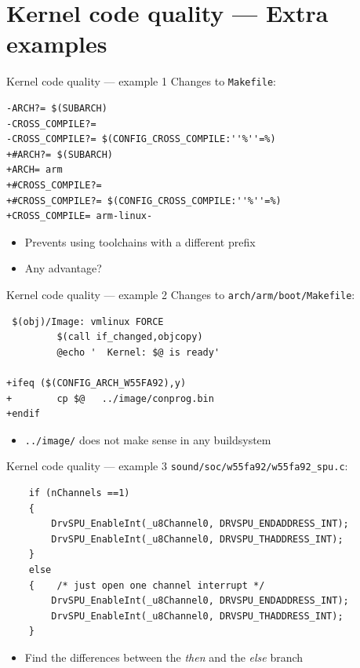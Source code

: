 \documentclass[xetex,table,aspectratio=169]{beamer}
\begin{document}
\section{Kernel code quality --- Extra examples}

\begin{frame}[fragile]{Kernel code quality --- example 1}
  Changes to \texttt{Makefile}:

  \begin{verbatim}
-ARCH?= $(SUBARCH)
-CROSS_COMPILE?=
-CROSS_COMPILE?= $(CONFIG_CROSS_COMPILE:''%''=%)
+#ARCH?= $(SUBARCH)
+ARCH= arm
+#CROSS_COMPILE?=
+#CROSS_COMPILE?= $(CONFIG_CROSS_COMPILE:''%''=%)
+CROSS_COMPILE= arm-linux-
  \end{verbatim}

  \begin{itemize}
  \item Prevents using toolchains with a different prefix
  \item Any advantage?
  \end{itemize}
\end{frame}

\begin{frame}[fragile]{Kernel code quality --- example 2}
  Changes to \texttt{arch/arm/boot/Makefile}:

  \begin{verbatim}
 $(obj)/Image: vmlinux FORCE
         $(call if_changed,objcopy)
         @echo '  Kernel: $@ is ready'

+ifeq ($(CONFIG_ARCH_W55FA92),y)
+        cp $@   ../image/conprog.bin
+endif
  \end{verbatim}

  \begin{itemize}
  \item \texttt{../image/} does not make sense in any buildsystem
  \end{itemize}
\end{frame}

\begin{frame}[fragile]{Kernel code quality --- example 3}
  \texttt{sound/soc/w55fa92/w55fa92\_spu.c}:

  \begin{verbatim}
    if (nChannels ==1)
    {
        DrvSPU_EnableInt(_u8Channel0, DRVSPU_ENDADDRESS_INT);
        DrvSPU_EnableInt(_u8Channel0, DRVSPU_THADDRESS_INT);
    }
    else
    {    /* just open one channel interrupt */
        DrvSPU_EnableInt(_u8Channel0, DRVSPU_ENDADDRESS_INT);
        DrvSPU_EnableInt(_u8Channel0, DRVSPU_THADDRESS_INT);
    }
  \end{verbatim}

  \begin{itemize}
  \item Find the differences between the {\em then} and the {\em else} branch
  \end{itemize}
\end{frame}
\end{document}
